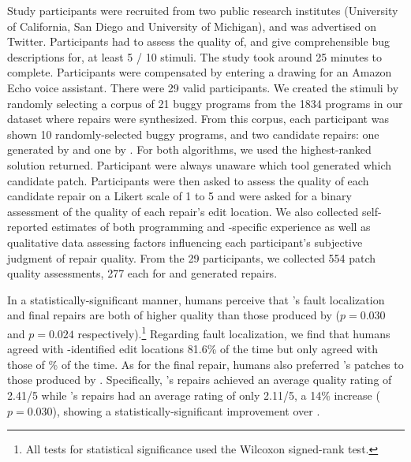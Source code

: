 %
Study participants were recruited from two public research institutes
(University of California, San Diego and University of Michigan), and was
advertised on Twitter.
%
Participants had to assess the quality of, and give comprehensible
bug descriptions for, at least 5 / 10 stimuli. The study took around
25 minutes to complete. Participants were compensated by entering a
drawing for an Amazon Echo voice assistant. There were 29 valid participants.
%
We created the stimuli by randomly selecting a corpus of 21 buggy programs
from the 1834 programs in our dataset where repairs were synthesized.
%
From this corpus, each participant was shown 10 randomly-selected buggy
programs, and two candidate repairs: one generated by \toolname and one
by \seminal.
%
For both algorithms, we used the highest-ranked solution returned.
%
Participant were always unaware which tool generated which candidate
patch.
%
Participants were then asked to assess the quality of each
candidate repair on a Likert scale of 1 to 5 and were asked
for a binary assessment of the quality of each repair's edit
location.
%
We also collected self-reported estimates of both programming and
\ocaml-specific experience as well as qualitative data assessing factors
influencing each participant's subjective judgment of repair quality.
%
From the 29 participants, we collected 554 patch quality assessments,
277 each for \toolname and \seminal generated repairs.


%
In a statistically-significant manner, humans perceive that
\toolname's fault localization and final repairs are both
of higher quality than those produced by \seminal ($p=0.030$
and $p=0.024$ respectively).\footnote{All tests for statistical
significance used the Wilcoxon signed-rank test.}
%
Regarding fault localization, we find that humans agreed
with \toolname-identified edit locations 81.6\% of the time
but only agreed with those of \% of the time.
%
%
As for the final repair, humans also preferred \toolname's patches
to those produced by \seminal. Specifically, \toolname's repairs
achieved an average quality rating of 2.41/5 while \seminal's
repairs had an average rating of only 2.11/5, a 14\% increase ($p=0.030$),
showing a statistically-significant improvement over \seminal.

